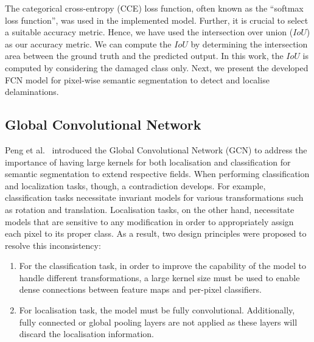 \documentclass[runningheads]{llncs}
\begin{document}
The categorical cross-entropy (CCE) loss function, often known as the  \enquote{softmax loss function}, was used in the implemented model.
Further, it is crucial to select a suitable accuracy metric.
Hence, we have used the intersection over union (\(IoU\)) as our accuracy metric. 
We can compute the \(IoU\) by determining the intersection area between the ground truth and the predicted output.
In this work,  the \(IoU\) is computed by considering the damaged class only.
Next, we present the developed FCN model for pixel-wise semantic segmentation to detect and localise delaminations.
\subsection{Global Convolutional Network}
Peng et al.~\cite{Peng2017} introduced the Global Convolutional Network (GCN) to address the importance of having large kernels for both localisation and classification for semantic segmentation to extend respective fields.
When performing classification and localization tasks, though, a contradiction develops.
For example, classification tasks necessitate invariant models for various transformations such as rotation and translation.
Localisation tasks, on the other hand, necessitate models that are sensitive to any modification in order to appropriately assign each pixel to its proper class.
As a result, two design principles were proposed to resolve this inconsistency:
\begin{enumerate}
	\item For the classification task, in order to improve the capability of 
	the model to handle different transformations, a large kernel size must be 
	used to enable dense connections between feature maps and per-pixel 
	classifiers.
	\item For localisation task, the model must be fully convolutional. 
	Additionally, fully connected or global pooling layers are not applied as 
	these layers will discard the localisation information. 
\end{enumerate}
\end{document}
